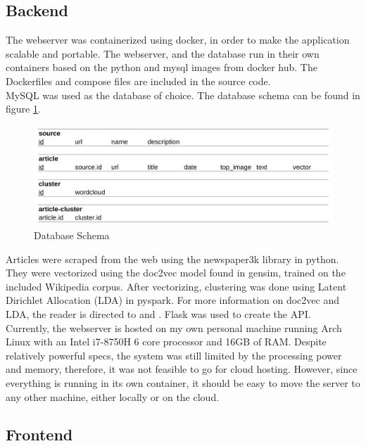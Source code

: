 \documentclass[12pt]{article}
\begin{document}
\subsection{Backend}

The webserver was containerized using docker, in order to make the application scalable and portable. The webserver, and the database run in their own containers based on the python and mysql images from docker hub. The Dockerfiles and compose files are included in the source code.\\

MySQL was used as the database of choice. The database schema can be found in figure \ref{fig:schema}.\\

\begin{figure}
  \centering
  \includegraphics[width=\textwidth]{db_schema.jpg}
  \caption{Database Schema}
  \label{fig:schema}
\end{figure}

Articles were scraped from the web using the newspaper3k library in python. They were vectorized using the doc2vec model found in gensim, trained on the included Wikipedia corpus. After vectorizing, clustering was done using Latent Dirichlet Allocation (LDA) in pyspark. For more information on doc2vec and LDA, the reader is directed to \cite{le14} and \cite{blei03}. Flask was used to create the API.\\

Currently, the webserver is hosted on my own personal machine running Arch Linux with an Intel i7-8750H 6 core processor and 16GB of RAM. Despite relatively powerful specs, the system was still limited by the processing power and memory, therefore, it was not feasible to go for cloud hosting. However, since everything is running in its own container, it should be easy to move the server to any other machine, either locally or on the cloud.

\subsection{Frontend}
\end{document}
